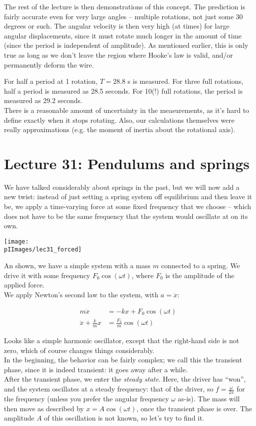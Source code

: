 The rest of the lecture is then demonstrations of this concept. The prediction is fairly accurate even for very large angles -- multiple rotations, not just some 30 degrees or such. The angular velocity is then very high (at times) for large angular displacements, since it must rotate much longer in the amount of time (since the period is independent of amplitude). As mentioned earlier, this is only true as long as we don't leave the region where Hooke's law is valid, and/or permanently deform the wire.

For half a period at 1 rotation, $T = 28.8$ s is measured. For three full rotations, half a period is measured as 28.5 seconds. For 10(!) full rotations, the period is measured as 29.2 seconds.\\
There is a reasonable amount of uncertainty in the measurements, as it's hard to define exactly when it stops rotating. Also, our calculations themselves were really approximations (e.g. the moment of inertia about the rotational axis).

\section{Lecture 31: Pendulums and springs}

We have talked considerably about springs in the past, but we will now add a new twist: instead of just setting a spring system off equilibrium and then leave it be, we apply a time-varying force at some fixed frequency that we choose -- which does not have to be the same frequency that the system would oscillate at on its own.

\begin{center}
\texttt{[image: \\pIImages/lec31\_forced]}
\end{center}

An shown, we have a simple system with a mass $m$ connected to a spring. We drive it with some frequency $F_0 \cos (\omega t)$, where $F_0$ is the amplitude of the applied force.\\
We apply Newton's second law to the system, with $a = \ddot{x}$:

\begin{align}
m \ddot{x} &= - k x + F_0 \cos (\omega t)\\
\ddot{x} + \frac{k}{m} x &=  \frac{F_0}{m} \cos (\omega t)
\end{align}

Looks like a simple harmonic oscillator, except that the right-hand side is not zero, which of course changes things considerably.\\
In the beginning, the behavior can be fairly complex; we call this the transient phase, since it is indeed transient: it goes away after a while.\\
After the transient phase, we enter the \emph{steady state}. Here, the driver has ``won'', and the system oscillates at a steady frequency: that of the driver, so $\displaystyle f = \frac{\omega}{2 \pi}$ for the frequency (unless you prefer the angular frequency $\omega$ as-is). The mass will then move as described by $x = A \cos (\omega t)$, once the transient phase is over. The amplitude $A$ of this oscillation is not known, so let's try to find it.

